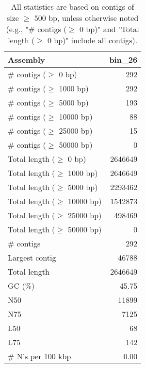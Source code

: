 \documentclass[12pt,a4paper]{article}
\begin{document}
\begin{table}[ht]
\begin{center}
\caption{All statistics are based on contigs of size $\geq$ 500 bp, unless otherwise noted (e.g., "\# contigs ($\geq$ 0 bp)" and "Total length ($\geq$ 0 bp)" include all contigs).}
\begin{tabular}{|l*{1}{|r}|}
\hline
Assembly & bin\_26 \\ \hline
\# contigs ($\geq$ 0 bp) & 292 \\ \hline
\# contigs ($\geq$ 1000 bp) & 292 \\ \hline
\# contigs ($\geq$ 5000 bp) & 193 \\ \hline
\# contigs ($\geq$ 10000 bp) & 88 \\ \hline
\# contigs ($\geq$ 25000 bp) & 15 \\ \hline
\# contigs ($\geq$ 50000 bp) & 0 \\ \hline
Total length ($\geq$ 0 bp) & 2646649 \\ \hline
Total length ($\geq$ 1000 bp) & 2646649 \\ \hline
Total length ($\geq$ 5000 bp) & 2293462 \\ \hline
Total length ($\geq$ 10000 bp) & 1542873 \\ \hline
Total length ($\geq$ 25000 bp) & 498469 \\ \hline
Total length ($\geq$ 50000 bp) & 0 \\ \hline
\# contigs & 292 \\ \hline
Largest contig & 46788 \\ \hline
Total length & 2646649 \\ \hline
GC (\%) & 45.75 \\ \hline
N50 & 11899 \\ \hline
N75 & 7125 \\ \hline
L50 & 68 \\ \hline
L75 & 142 \\ \hline
\# N's per 100 kbp & 0.00 \\ \hline
\end{tabular}
\end{center}
\end{table}
\end{document}
